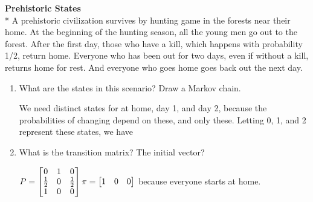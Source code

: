 \question \textbf{Prehistoric States} \\*
A prehistoric civilization survives by hunting game in the forests near 
their home. At the beginning of the hunting season, all the young men 
go out to the forest. After the first day, those who have a kill, 
which happens with probability 1/2, return home. Everyone who has been 
out for two days, even if without a kill, returns home for rest. And 
everyone who goes home goes back out the next day.
\begin{enumerate}
\item
What are the states in this scenario? Draw a Markov chain.
\begin{solution}[4cm]
We need distinct states for at home, day 1, and day 2, because the 
probabilities of changing depend on these, and only these. Letting 0, 
1, and 2 represent these states, we have

\begin{center}
\end{center}
\end{solution}

\newpage
\item
What is the transition matrix? The  initial vector?
\begin{solution}[4cm]
$ P = \begin{bmatrix}
0 & 1 & 0 \\
\frac{1}{2} & 0 & \frac{1}{2} \\
1 & 0 & 0
\end{bmatrix} \\
\pi = \begin{bmatrix} 1 & 0 & 0 \end{bmatrix}$ because everyone starts 
at home.
\end{solution}


\end{enumerate}
